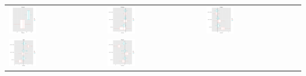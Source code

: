 \documentclass[a4paper]{article}
\begin{document}
          	\begin{table}[ht]
          		\centering
          		\begin{tabular}{lll}
          			\includegraphics[width = 0.3\textwidth]{plots/DareIntercept-1.png} &
          			\includegraphics[width = 0.3\textwidth]{plots/DareOutdegree-1.png} &
          			\includegraphics[width = 0.3\textwidth]{plots/DareIndegree-1.png} \\
          			\includegraphics[width = 0.3\textwidth]{plots/DareBSend-1.png} &
          			\includegraphics[width = 0.3\textwidth]{plots/DareBReceive-1.png} &

\end{tabular}
\end{table}
\end{document}
